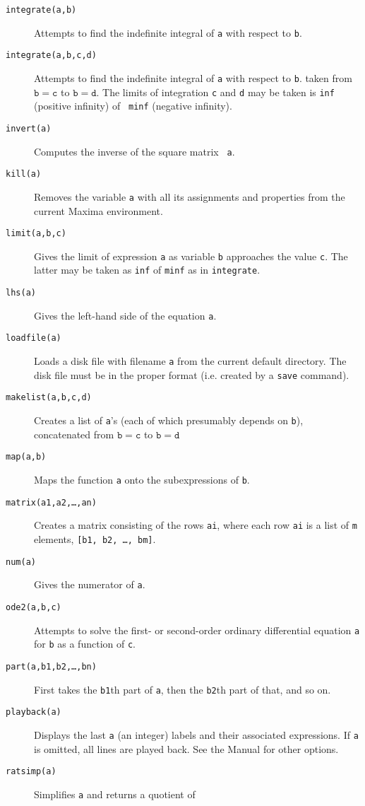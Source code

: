 \documentclass[a4paper,12pt]{article}
\begin{document}
\begin{description}
\item[{\tt integrate(a,b)}] Attempts to find the indefinite integral
  of {\tt a} with respect to {\tt b}.
\item[{\tt integrate(a,b,c,d)}] Attempts to find the indefinite
  integral of {\tt a} with respect to {\tt b}. taken from
  $\mathtt{b=c}$ to $\mathtt{b=d}$.  The limits of integration {\tt c}
  and {\tt d} may be taken is {\tt inf} (positive infinity) of {\tt
    minf} (negative infinity).
\item[{\tt invert(a)}] Computes the inverse of the square matrix {\tt
    a}.
\item[{\tt kill(a)}] Removes the variable {\tt a} with all its
  assignments and properties from the current Maxima environment.
\item[{\tt limit(a,b,c)}] Gives the limit of expression {\tt a} as
  variable {\tt b} approaches the value {\tt c}.  The latter may be
  taken as {\tt inf} of {\tt minf} as in {\tt integrate}.
\item[{\tt lhs(a)}] Gives the left-hand side of the equation {\tt a}.
\item[{\tt loadfile(a)}] Loads a disk file with filename {\tt a} from
  the current default directory.  The disk file must be in the proper
  format (i.e. created by a {\tt save} command).
\item[{\tt makelist(a,b,c,d)}] Creates a list of {\tt a}'s (each of
  which presumably depends on {\tt b}), concatenated from
  $\mathtt{b=c}$ to $\mathtt{b=d}$
\item[{\tt map(a,b)}] Maps the function {\tt a} onto the
  subexpressions of {\tt b}.
\item[{\tt matrix(a1,a2,\ldots,an)}] Creates a matrix consisting of the rows {\tt ai}, where each
  row {\tt ai} is a list of {\tt m} elements, {\tt [b1, b2, \ldots, bm]}.
\item[{\tt num(a)}] Gives the numerator of {\tt a}.
\item[{\tt ode2(a,b,c)}] Attempts to solve the first- or second-order
  ordinary differential equation {\tt a} for {\tt b} as a function of
  {\tt c}.
\item[{\tt part(a,b1,b2,\ldots,bn)}] First takes the {\tt b1}th part
  of {\tt a}, then the {\tt b2}th part of that, and so on.
\item[{\tt playback(a)}] Displays the last {\tt a} (an integer)
  labels and their associated expressions.  If {\tt a} is omitted,
  all lines are played back.  See the Manual for other options.
\item[{\tt ratsimp(a)}] Simplifies {\tt a} and returns a quotient of

\end{description}
\end{document}
